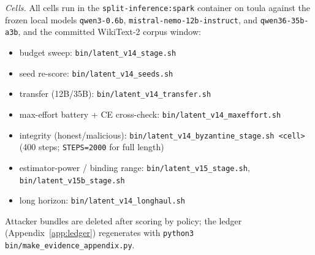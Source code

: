 \documentclass[10pt]{article}
\begin{document}
\emph{Cells.} All cells run in the \texttt{split-inference:spark}
container on toula against the frozen local models
\texttt{qwen3-0.6b}, \texttt{mistral-nemo-12b-\allowbreak instruct},
and \texttt{qwen36-35b-a3b}, and the committed WikiText-2 corpus window:
\begin{itemize}\setlength{\itemsep}{0pt}\footnotesize
\item budget sweep: \texttt{bin/latent\_\allowbreak v14\_\allowbreak stage.sh}
\item seed re-score: \texttt{bin/latent\_\allowbreak v14\_\allowbreak seeds.sh}
\item transfer (12B/35B): \texttt{bin/latent\_\allowbreak v14\_\allowbreak transfer.sh}
\item max-effort battery + CE cross-check:
      \texttt{bin/latent\_\allowbreak v14\_\allowbreak maxeffort.sh}
\item integrity (honest/malicious):
      \texttt{bin/latent\_\allowbreak v14\_\allowbreak byzantine\_\allowbreak stage.sh <cell>}
      (400 steps; \texttt{STEPS=2000} for full length)
\item estimator-power / binding range: \texttt{bin/latent\_\allowbreak v15\_\allowbreak stage.sh},
      \texttt{bin/latent\_\allowbreak v15b\_\allowbreak stage.sh}
\item long horizon: \texttt{bin/latent\_\allowbreak v14\_\allowbreak longhaul.sh}
\end{itemize}
Attacker bundles are deleted after scoring by policy; the ledger
(Appendix~\ref{app:ledger}) regenerates with
\texttt{python3 bin/make\_evidence\_appendix.py}.
\end{document}
